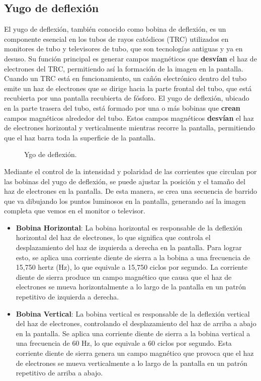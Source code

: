 \documentclass[
	12pt, %
	fleqn, %
	a4paper, %
	oneside, %
]{LegrandOrangeBook}
\begin{document}
\subsection{Yugo de deflexión}
El yugo de deflexión, también conocido como bobina de deflexión, es un componente esencial en los tubos de rayos catódicos (TRC) utilizados en monitores de tubo y televisores de tubo, que son tecnologías antiguas y ya en desuso. Su función principal es generar campos magnéticos que \textbf{desvían} el haz de electrones del TRC, permitiendo así la formación de la imagen en la pantalla.\\
Cuando un TRC está en funcionamiento, un cañón electrónico dentro del tubo emite un haz de electrones que se dirige hacia la parte frontal del tubo, que está recubierta por una pantalla recubierta de fósforo. El yugo de deflexión, ubicado en la parte trasera del tubo, está formado por una o más bobinas que \textbf{crean} campos magnéticos alrededor del tubo. Estos campos magnéticos \textbf{desvían} el haz de electrones horizontal y verticalmente mientras recorre la pantalla, permitiendo que el haz barra toda la superficie de la pantalla.
\begin{figure}[H]
\centering
{}
\caption{Ygo de deflexión.}
\end{figure}
Mediante el control de la intensidad y polaridad de las corrientes que circulan por las bobinas del yugo de deflexión, se puede ajustar la posición y el tamaño del haz de electrones en la pantalla. De esta manera, se crea una secuencia de barrido que va dibujando los puntos luminosos en la pantalla, generando así la imagen completa que vemos en el monitor o televisor.
\begin{itemize}
\item \textbf{Bobina Horizontal}: La bobina horizontal es responsable de la deflexión horizontal del haz de electrones, lo que significa que controla el desplazamiento del haz de izquierda a derecha en la pantalla. Para lograr esto, se aplica una corriente diente de sierra a la bobina a una frecuencia de 15,750 hertz (Hz), lo que equivale a 15,750 ciclos por segundo. La corriente diente de sierra produce un campo magnético que causa que el haz de electrones se mueva horizontalmente a lo largo de la pantalla en un patrón repetitivo de izquierda a derecha.

\item \textbf{Bobina Vertical}: La bobina vertical es responsable de la deflexión vertical del haz de electrones, controlando el desplazamiento del haz de arriba a abajo en la pantalla. Se aplica una corriente diente de sierra a la bobina vertical a una frecuencia de 60 Hz, lo que equivale a 60 ciclos por segundo. Esta corriente diente de sierra genera un campo magnético que provoca que el haz de electrones se mueva verticalmente a lo largo de la pantalla en un patrón repetitivo de arriba a abajo.
\end{itemize}
\end{document}
